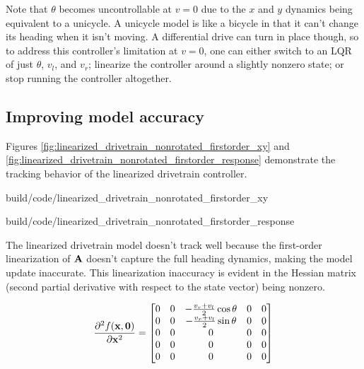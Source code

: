 \begin{remark}
Note that $\theta$ becomes uncontrollable at $v = 0$ due to the $x$ and $y$
dynamics being equivalent to a unicycle. A unicycle model is like a bicycle in
that it can't change its heading when it isn't moving. A differential drive can
turn in place though, so to address this controller's limitation at $v = 0$, one
can either switch to an LQR of just $\theta$, $v_l$, and $v_r$; linearize the
controller around a slightly nonzero state; or stop running the controller
altogether.
\end{remark}

\subsection{Improving model accuracy}

Figures \ref{fig:linearized_drivetrain_nonrotated_firstorder_xy} and
\ref{fig:linearized_drivetrain_nonrotated_firstorder_response} demonstrate the
tracking behavior of the linearized drivetrain controller.

\begin{bookfigure}
  \begin{minisvg}{build/code/linearized_drivetrain_nonrotated_firstorder_xy}
    \caption{Linearized drivetrain controller x-y plot (first order)}
    \label{fig:linearized_drivetrain_nonrotated_firstorder_xy}
  \end{minisvg}
  \hfill
  \begin{minisvg}{build/code/linearized_drivetrain_nonrotated_firstorder_response}
    \caption{Linearized drivetrain controller response (first order)}
    \label{fig:linearized_drivetrain_nonrotated_firstorder_response}
  \end{minisvg}
\end{bookfigure}

The linearized drivetrain model doesn't track well because the first-order
linearization of $\mathbf{A}$ doesn't capture the full heading dynamics, making the
\gls{model} update inaccurate. This linearization inaccuracy is evident in the
Hessian matrix (second partial derivative with respect to the state vector)
being nonzero.

\begin{equation*}
  \frac{\partial^2 f(\mathbf{x}, \mathbf{0})}{\partial\mathbf{x}^2} =
  \begin{bmatrix}
    0 & 0 & -\frac{v_r + v_l}{2}\cos\theta & 0 & 0 \\
    0 & 0 & -\frac{v_r + v_l}{2}\sin\theta & 0 & 0 \\
    0 & 0 & 0 & 0 & 0 \\
    0 & 0 & 0 & 0 & 0 \\
    0 & 0 & 0 & 0 & 0
  \end{bmatrix}
\end{equation*}

